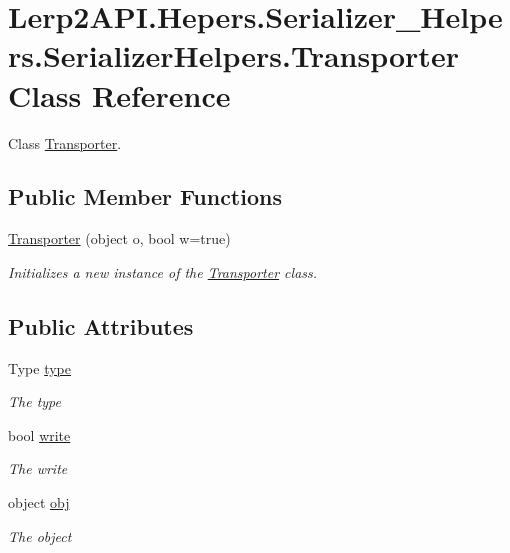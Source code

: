 \hypertarget{class_lerp2_a_p_i_1_1_hepers_1_1_serializer___helpers_1_1_serializer_helpers_1_1_transporter}{}\section{Lerp2\+A\+P\+I.\+Hepers.\+Serializer\+\_\+\+Helpers.\+Serializer\+Helpers.\+Transporter Class Reference}
\label{class_lerp2_a_p_i_1_1_hepers_1_1_serializer___helpers_1_1_serializer_helpers_1_1_transporter}


Class \hyperlink{class_lerp2_a_p_i_1_1_hepers_1_1_serializer___helpers_1_1_serializer_helpers_1_1_transporter}{Transporter}.  


\subsection*{Public Member Functions}
\begin{DoxyCompactItemize}
\item 
\hyperlink{class_lerp2_a_p_i_1_1_hepers_1_1_serializer___helpers_1_1_serializer_helpers_1_1_transporter_ae28282bff488fa5effe3853b5e9584a3}{Transporter} (object o, bool w=true)
\begin{DoxyCompactList}\small\item\em Initializes a new instance of the \hyperlink{class_lerp2_a_p_i_1_1_hepers_1_1_serializer___helpers_1_1_serializer_helpers_1_1_transporter}{Transporter} class. \end{DoxyCompactList}\end{DoxyCompactItemize}
\subsection*{Public Attributes}
\begin{DoxyCompactItemize}
\item 
Type \hyperlink{class_lerp2_a_p_i_1_1_hepers_1_1_serializer___helpers_1_1_serializer_helpers_1_1_transporter_ae75ad019b18dfd9ddaa9abfc7276b2e9}{type}
\begin{DoxyCompactList}\small\item\em The type \end{DoxyCompactList}\item 
bool \hyperlink{class_lerp2_a_p_i_1_1_hepers_1_1_serializer___helpers_1_1_serializer_helpers_1_1_transporter_a5caa71a4d793f89d12b996d44668791d}{write}
\begin{DoxyCompactList}\small\item\em The write \end{DoxyCompactList}\item 
object \hyperlink{class_lerp2_a_p_i_1_1_hepers_1_1_serializer___helpers_1_1_serializer_helpers_1_1_transporter_a28464c890185cf1fe45af5ccf6ef6da5}{obj}
\begin{DoxyCompactList}\small\item\em The object \end{DoxyCompactList}\end{DoxyCompactItemize}


